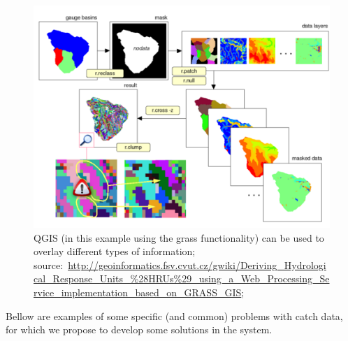 \documentclass[11pt]{article} %
\begin{document}
  \begin{figure}[!ht]%
    \begin{center} 
	\includegraphics[width=\textwidth]{layers}
      \caption[QGIS (in this example using the grass functionality) can be used to overlay different types of information;]
{QGIS (in this example using the grass functionality) can be used to overlay different types of information; source:~\url{http://geoinformatics.fsv.cvut.cz/gwiki/Deriving_Hydrological_Response_Units_\%28HRUs\%29_using_a_Web_Processing_Service_implementation_based_on_GRASS_GIS};}
      \label{layers} %
    \end{center} 
  \end{figure}

Bellow are examples of some specific (and common) problems with catch data, for which we propose to develop some solutions in the system.%
\end{document}
